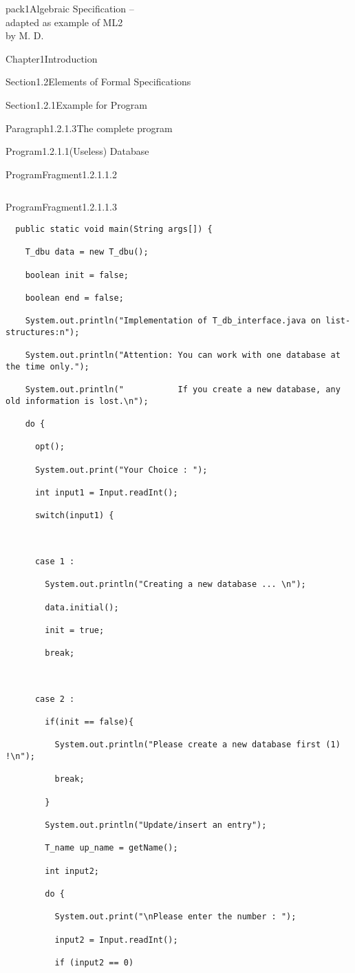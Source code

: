 \documentclass[landscape, slides, light]{mmiss2}
\begin{document}
\begin{Package}{pack1}{Algebraic
Specification -- \\ adapted as example of ML2\\ by M. D.}
\begin{Section}{Chapter1}{Introduction}
\begin{Section}{Section1.2}{Elements of Formal Specifications}{}
\begin{Section}{Section1.2.1}{Example for Program}{}
\begin{Paragraph}{Paragraph1.2.1.3}{The complete program}{}
\begin{Program}{Program1.2.1.1}{(Useless) Database}{}
\begin{ProgramFragment}{ProgramFragment1.2.1.1.2}{}{}
\begin{verbatim}
\end{verbatim}
\normalsize
\end{ProgramFragment}
\begin{ProgramFragment}{ProgramFragment1.2.1.1.3}{}{}
\tiny
\begin{verbatim}
  public static void main(String args[]) {

    T_dbu data = new T_dbu();

    boolean init = false;

    boolean end = false;

    System.out.println("Implementation of T_db_interface.java on list-structures:n");

    System.out.println("Attention: You can work with one database at the time only.");

    System.out.println("           If you create a new database, any old information is lost.\n");

    do {

      opt();

      System.out.print("Your Choice : ");  

      int input1 = Input.readInt();

      switch(input1) {



      case 1 :

        System.out.println("Creating a new database ... \n");

        data.initial();

        init = true;

        break;



      case 2 :

        if(init == false){

          System.out.println("Please create a new database first (1) !\n");

          break;

        }

        System.out.println("Update/insert an entry");

        T_name up_name = getName();

        int input2;

        do {

          System.out.print("\nPlease enter the number : ");

          input2 = Input.readInt();

          if (input2 == 0)


\end{verbatim}
\end{ProgramFragment}
\end{Program}
\end{Paragraph}
\end{Section}
\end{Section}
\end{Section}
\end{Package}
\end{document}
